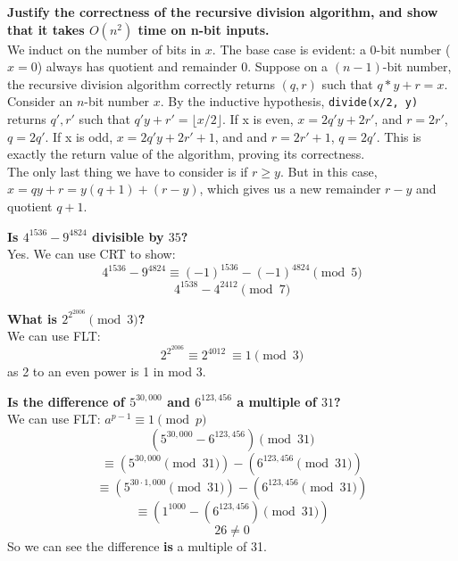 \begin{problem}{1.8}
    \textbf{Justify the correctness of the recursive division algorithm, and show that it takes $O(n^2)$ time on n-bit inputs.}
    \\
    We induct on the number of bits in $x$. The base case is evident: a 0-bit number ($x = 0$) always has quotient and remainder 0. Suppose on a $(n - 1)$-bit number, the recursive division algorithm correctly returns $(q, r)$ such that $q * y + r = x$. 
    \\
    Consider an $n$-bit number $x$. By the inductive hypothesis, \texttt{divide(x/2, y)} returns $q', r'$ such that $q'y + r' = \lfloor x/2 \rfloor$.
    If x is even, $x = 2q'y + 2r'$, and $r = 2r'$, $q = 2q'$. If x is odd, $x = 2q'y + 2r' + 1$, and and $r = 2r' + 1$, $q = 2q'$. This is exactly the return value of the algorithm, proving its correctness.
    \\
    The only last thing we have to consider is if $r \geq y$. But in this case, $x = qy + r = y(q + 1) + (r - y)$, which gives us a new remainder $r - y$ and quotient $q + 1$.
\end{problem}

\begin{problem}{1.11}
    \textbf{Is $4^{1536} - 9^{4824}$ divisible by $35$?}
    \\
    Yes. We can use CRT to show:
    \[
        4^{1536} - 9^{4824} \equiv (-1)^{1536} - (-1)^{4824} \pmod 5
    \]
    \[
        4^{1538} - 4^{2412} \pmod 7
    \]
\end{problem}

\begin{problem}{1.12}
    \textbf{What is $2^{2^{2006}} \pmod 3$?}
    \\
    We can use FLT:
    \[
        2^{2^{2006}} \equiv 2^{4012} \ \boxed{\equiv 1 \pmod 3}
    \]
    as 2 to an even power is 1 in mod 3.
\end{problem}

\begin{problem}{1.13}
    \textbf{Is the difference of $5^{30,000}$ and $6^{123,456}$ a multiple of $31$?}
    \\
    We can use FLT: $a^{p-1}\equiv 1 \pmod p$
    \[
        (5^{30,000} - 6^{123,456}) \pmod{31}
    \]
    \[
        \equiv (5^{30,000} \pmod{31}) - (6^{123,456} \pmod{31})
    \]
    \[
        \equiv (5^{30\cdot 1,000} \pmod{31}) - (6^{123,456} \pmod{31})
    \]
    \[
        \equiv (1^{1000} - (6^{123,456}) \pmod{31})
    \]
    \[
        26 \neq 0
    \]
    So we can see the difference \textbf{is} a multiple of 31.
\end{problem}

